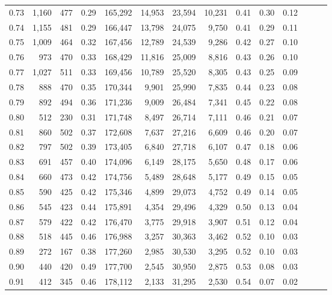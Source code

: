\begin{tabular}{rrrrrrrrrrrrrr}
0.73 &  1,160 &  477 &  0.29 &  165,292 &   14,953 &  23,594 &  10,231 &  0.41 &  0.30 &      0.12 \\
0.74 &  1,155 &  481 &  0.29 &  166,447 &   13,798 &  24,075 &   9,750 &  0.41 &  0.29 &      0.11 \\
0.75 &  1,009 &  464 &  0.32 &  167,456 &   12,789 &  24,539 &   9,286 &  0.42 &  0.27 &      0.10 \\
0.76 &    973 &  470 &  0.33 &  168,429 &   11,816 &  25,009 &   8,816 &  0.43 &  0.26 &      0.10 \\
0.77 &  1,027 &  511 &  0.33 &  169,456 &   10,789 &  25,520 &   8,305 &  0.43 &  0.25 &      0.09 \\
0.78 &    888 &  470 &  0.35 &  170,344 &    9,901 &  25,990 &   7,835 &  0.44 &  0.23 &      0.08 \\
0.79 &    892 &  494 &  0.36 &  171,236 &    9,009 &  26,484 &   7,341 &  0.45 &  0.22 &      0.08 \\
0.80 &    512 &  230 &  0.31 &  171,748 &    8,497 &  26,714 &   7,111 &  0.46 &  0.21 &      0.07 \\
0.81 &    860 &  502 &  0.37 &  172,608 &    7,637 &  27,216 &   6,609 &  0.46 &  0.20 &      0.07 \\
0.82 &    797 &  502 &  0.39 &  173,405 &    6,840 &  27,718 &   6,107 &  0.47 &  0.18 &      0.06 \\
0.83 &    691 &  457 &  0.40 &  174,096 &    6,149 &  28,175 &   5,650 &  0.48 &  0.17 &      0.06 \\
0.84 &    660 &  473 &  0.42 &  174,756 &    5,489 &  28,648 &   5,177 &  0.49 &  0.15 &      0.05 \\
0.85 &    590 &  425 &  0.42 &  175,346 &    4,899 &  29,073 &   4,752 &  0.49 &  0.14 &      0.05 \\
0.86 &    545 &  423 &  0.44 &  175,891 &    4,354 &  29,496 &   4,329 &  0.50 &  0.13 &      0.04 \\
0.87 &    579 &  422 &  0.42 &  176,470 &    3,775 &  29,918 &   3,907 &  0.51 &  0.12 &      0.04 \\
0.88 &    518 &  445 &  0.46 &  176,988 &    3,257 &  30,363 &   3,462 &  0.52 &  0.10 &      0.03 \\
0.89 &    272 &  167 &  0.38 &  177,260 &    2,985 &  30,530 &   3,295 &  0.52 &  0.10 &      0.03 \\
0.90 &    440 &  420 &  0.49 &  177,700 &    2,545 &  30,950 &   2,875 &  0.53 &  0.08 &      0.03 \\
0.91 &    412 &  345 &  0.46 &  178,112 &    2,133 &  31,295 &   2,530 &  0.54 &  0.07 &      0.02 \\

\end{tabular}
